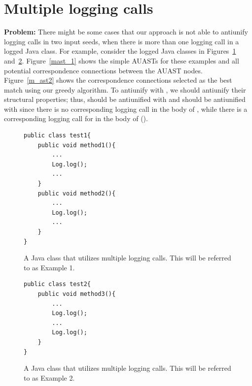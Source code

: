 \section{Multiple logging calls} \label{meth-multipleLogs}
\textbf{Problem:} There might be some cases that our approach is not able to antiunify logging calls in two input seeds, when there is more than one logging call in a logged Java class. For example, consider the logged Java classes in Figures~\ref{multiple1} and~\ref{multiple2}. Figure~\ref{mast_1} shows the simple AUASTs for these examples and all potential correspondence connections between the AUAST nodes. Figure~\ref{m_ast2} shows the correspondence connections selected as the best match using our greedy algorithm. To antiunify  with , we should antiunify their structural properties; thus,  should be antiunified with  and  should be antiunified with \nothing{} since there is no corresponding logging call in the body of , while there is a corresponding logging call for  in the body of  ().


\begin{figure}[H]
\def\baselinestretch{1}
\begin{lstlisting}
public class test1{
	public void method1(){
		...
		Log.log();
		...
	}
	public void method2(){
		...
		Log.log();
		...
	}
}
\end{lstlisting}
\caption{A Java class that utilizes multiple logging calls. This will be referred to as Example 1.\label{multiple1}}
\end{figure}



\begin{figure}[H]
\def\baselinestretch{1}
\begin{lstlisting}
public class test2{
	public void method3(){
		...
		Log.log();
		...
		Log.log();
	}
}
\end{lstlisting}
\caption{A Java class that utilizes multiple logging calls. This will be referred to as Example 2.\label{multiple2}}
\end{figure}

